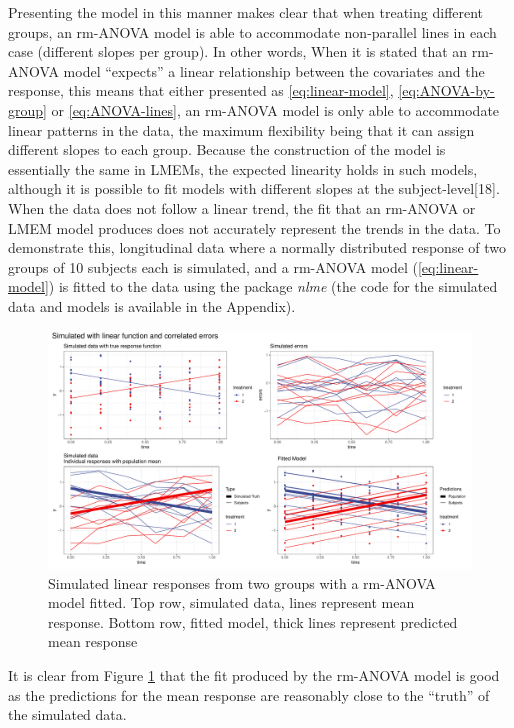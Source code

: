 \documentclass[
]{article}
\begin{document}
Presenting the model in this manner makes clear that when treating different groups, an rm-ANOVA model is able to accommodate non-parallel lines in each case (different slopes per group). In other words, When it is stated that an rm-ANOVA model ``expects'' a linear relationship between the covariates and the response, this means that either presented as \eqref{eq:linear-model}, \eqref{eq:ANOVA-by-group} or \eqref{eq:ANOVA-lines}, an rm-ANOVA model is only able to accommodate linear patterns in the data, the maximum flexibility being that it can assign different slopes to each group. Because the construction of the model is essentially the same in LMEMs, the expected linearity holds in such models, although it is possible to fit models with different slopes at the subject-level{[}18{]}.\\
When the data does not follow a linear trend, the fit that an rm-ANOVA or LMEM model produces does not accurately represent the trends in the data. To demonstrate this, longitudinal data where a normally distributed response of two groups of 10 subjects each is simulated, and a rm-ANOVA model (\eqref{eq:linear-model}) is fitted to the data using the package \emph{nlme} (the code for the simulated data and models is available in the Appendix).

\begin{figure}
\includegraphics[width=1\linewidth]{Manuscript_AM_v2_files/figure-latex/linear-model-1} \caption{Simulated linear responses from two groups with a rm-ANOVA model fitted. Top row, simulated data, lines represent mean response. Bottom row, fitted model, thick lines represent predicted mean response}\label{fig:linear-model}
\end{figure}

It is clear from Figure \ref{fig:linear-model} that the fit produced by the rm-ANOVA model is good as the predictions for the mean response are reasonably close to the ``truth'' of the simulated data.
\end{document}
